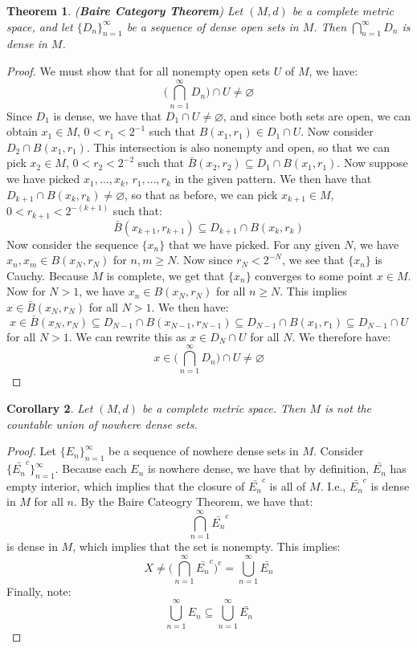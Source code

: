 \documentclass[a4paper,12pt]{report}
\newcommand{\sse} {\subseteq}
\newtheorem{theorem}{Theorem}[section]
\newtheorem{corollary}[theorem]{Corollary}
\begin{document}
	\begin{theorem}
	\emph{(\textbf{Baire Category Theorem})}
	Let $(M, d)$ be a complete metric space, and let $\{D_n\}_{n=1}^\infty$ be a sequence of dense open sets in $M$. Then $\bigcap_{n=1}^\infty D_n$ is dense in $M$.
	\end{theorem}
	\begin{proof}
	We must show that for all nonempty open sets $U$ of $M$, we have:
	\[ \bigg( \bigcap_{n=1}^\infty D_n \bigg) \cap U \neq \varnothing \]
	Since $D_1$ is dense, we have that $D_1 \cap U \neq \varnothing$, and since both sets are open, we can obtain $x_1 \in M$, $0 < r_1 < 2^{-1}$ such that $B(x_1, r_1) \in D_1 \cap U$. Now consider $D_2 \cap B(x_1, r_1)$. This intersection is also nonempty and open, so that we can pick $x_2 \in M$, $0 < r_2 < 2^{-2}$ such that $\bar{B}(x_2, r_2) \sse D_1 \cap B(x_1, r_1)$. Now suppose we have picked $x_1, \ldots, x_k$, $r_1, \ldots, r_k$ in the given pattern. We then have that $D_{k+1} \cap B(x_k, r_k) \neq \varnothing$, so that as before, we can pick $x_{k+1} \in M$, $0 < r_{k+1} < 2^{-(k+1)}$ such that:
	\[ \bar{B}(x_{k+1}, r_{k+1}) \sse D_{k+1} \cap B(x_k, r_k) \]
	Now consider the sequence $\{x_n\}$ that we have picked. For any given $N$, we have $x_n, x_m \in B(x_N, r_N)$ for $n, m \geq N$. Now since $r_N < 2^{-N}$, we see that $\{x_n\}$ is Cauchy. Because $M$ is complete, we get that $\{x_n\}$ converges to some point $x \in M$. Now for $N > 1$, we have $x_n \in B(x_N, r_N)$ for all $n \geq N$. This implies $x \in \bar{B}(x_N, r_N)$ for all $N > 1$. We then have:
	\[ x \in \bar{B}(x_N, r_N) \sse D_{N-1} \cap B(x_{N-1}, r_{N-1}) \sse D_{N-1} \cap B(x_1, r_1) \sse D_{N-1} \cap U \]
	for all $N > 1$. We can rewrite this as $x \in D_N \cap U$ for all $N$. We therefore have:
	\[ x \in \bigg( \bigcap_{n=1}^\infty D_n \bigg) \cap U \neq \varnothing \]
	\end{proof}
	
	\begin{corollary}
	Let $(M, d)$ be a complete metric space. Then $M$ is not the countable union of nowhere dense sets.
	\end{corollary}
	\begin{proof}
	Let $\{E_n\}_{n=1}^\infty$ be a sequence of nowhere dense sets in $M$. Consider $\{\bar{E_n}^c\}_{n=1}^\infty$. Because each $E_n$ is nowhere dense, we have that by definition, $\bar{E_n}$ has empty interior, which implies that the closure of $\bar{E_n}^c$ is all of $M$. I.e., $\bar{E_n}^c$ is dense in $M$ for all $n$. By the Baire Cateogry Theorem, we have that:
	\[ \bigcap_{n=1}^\infty \bar{E_n}^c \]
	is dense in $M$, which implies that the set is nonempty. This implies:
	\[ X \neq \bigg( \bigcap_{n=1}^\infty \bar{E_n}^c \bigg)^c = \bigcup_{n=1}^\infty \bar{E_n} \]
	Finally, note:
	\[ \bigcup_{n=1}^\infty E_n \sse \bigcup_{n=1}^\infty \bar{E_n} \]
	\end{proof}
	
\end{document}
